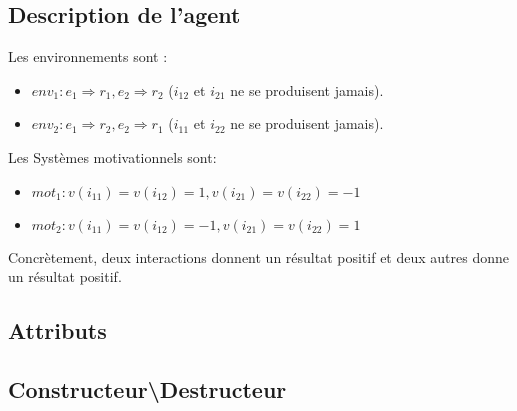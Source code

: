 \documentclass[11pt]{article}
\begin{document}
    \subsection{Description de l'agent}
    Les environnements sont :
      \begin{itemize}
      \item \begin{math} env_1: e_1 \Rightarrow r_1, e_2 \Rightarrow r_2 \end{math} 
      (\begin{math} i_{12}\end{math}  et \begin{math} i_{21}\end{math}  ne se produisent jamais).
      \item \begin{math} env_2:  e_1 \Rightarrow r_2, e_2 \Rightarrow r_1 \end{math} 
      (\begin{math} i_{11} \end{math} et \begin{math} i_{22}\end{math}  ne se produisent jamais).
      \end{itemize}
    Les Systèmes motivationnels sont:
      \begin{itemize}
      \item \begin{math} mot_1:  v(i_{11}) = v(i_{12}) = 1,v(i_{21}) = v(i_{22}) = -1\end{math}
      \item \begin{math} mot_2:  v(i_{11}) = v(i_{12}) = -1,v(i_{21}) = v(i_{22}) = 1 \end{math}
      \end{itemize}
      
      Concrètement, deux interactions donnent un résultat positif et deux autres donne un résultat positif.
    \subsection{Attributs}
    
    \subsection{Constructeur\textbackslash{}Destructeur}
    
\end{document}
